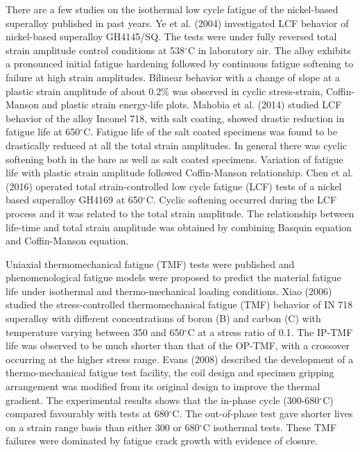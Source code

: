 There are a few studies on the isothermal low cycle fatigue of the nickel-based superalloy published in past years.
Ye et al. (2004) \cite{ye2004low} investigated LCF behavior of nickel-based superalloy GH4145/SQ. The tests were under fully reversed total strain amplitude control conditions at 538$^{\circ}$C in laboratory air. The alloy exhibits a pronounced initial fatigue hardening followed by continuous fatigue softening to failure at high strain amplitudes. Bilinear behavior with a change of slope at a plastic strain amplitude of about $0.2\%$ was observed in cyclic stress-strain, Coffin-Manson and plastic strain energy-life plots.
Mahobia et al. (2014) \cite{mahobia2014effect} studied LCF behavior of the alloy Inconel 718, with salt coating, showed drastic reduction in fatigue life at 650$^{\circ}$C. Fatigue life of the salt coated specimens was found to be drastically reduced at all the total strain amplitudes. In general there was cyclic softening both in the bare as well as salt coated specimens. Variation of fatigue life with plastic strain amplitude followed Coffin-Manson relationship.
Chen et al. (2016) \cite{Chen2016175} operated total strain-controlled low cycle fatigue (LCF) tests of a nickel based superalloy GH4169 at 650$^{\circ}$C. Cyclic softening occurred during the LCF process and it was related to the total strain amplitude. The relationship between life-time and total strain amplitude was obtained by combining Basquin equation and Coffin-Manson equation.

Uniaxial thermomechanical fatigue (TMF) tests \cite{remy2003thermal} were published and phenomenological fatigue models \cite{vose2013approach} were proposed to predict the material fatigue life under isothermal and thermo-mechanical loading conditions.
Xiao (2006) \cite{Xiao2006157} studied the stress-controlled thermomechanical fatigue (TMF) behavior of IN 718 superalloy with different concentrations of boron (B) and carbon (C) with temperature varying between 350 and 650$^{\circ}$C at a stress ratio of 0.1. The IP-TMF life was observed to be much shorter than that of the OP-TMF, with a crossover occurring at the higher stress range.
Evans (2008) \cite{evans2008thermo} described the development of a thermo-mechanical fatigue test facility, the coil design and specimen gripping arrangement was modified from its original design to improve the thermal gradient.
The experimental results shows that the in-phase cycle (300-680$^{\circ}$C) compared favourably with tests at 680$^{\circ}$C.
The out-of-phase test gave shorter lives on a strain range basis than either 300 or 680$^{\circ}$C isothermal tests.
These TMF failures were dominated by fatigue crack growth with evidence of closure.

